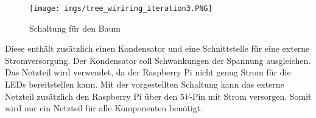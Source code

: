\documentclass[.../Dokumentation.tex]{subfiles}
\begin{document}
       	\begin{figure}[H]
    	\begin{center}
    		\texttt{[image: imgs/tree\_wiriring\_iteration3.PNG]}
    		\caption{Schaltung für den Baum}
    		\label{fig-tree_iteration3_wiring}
    	\end{center}
    \end{figure}
    \noindent
   	Diese enthält zusätzlich einen Kondensator und eine Schnittstelle für eine externe Stromversorgung. Der Kondensator soll Schwankungen der Spannung ausgleichen. Das Netzteil wird verwendet, da der Raspberry Pi nicht genug Strom für die LEDs bereitstellen kann. Mit der vorgestellten Schaltung kann das externe Netzteil zusätzlich den Raspberry Pi über den $5V$-Pin mit Strom versorgen. Somit wird nur ein Netzteil für alle Komponenten  benötigt.
   	
\end{document}
